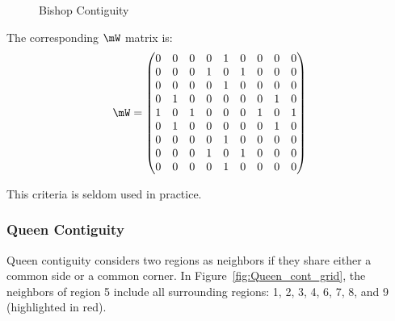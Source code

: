\documentclass[english,12pt]{book}\usepackage[]{graphicx}\usepackage[]{xcolor}
\begin{document}
\begin{figure}[h]
\caption{Bishop Contiguity}
\label{fig:Bishop_cont_grid}
\centering
{}
\end{figure}

The corresponding $\mW$ matrix is:
\begin{equation*}
\mW = 
  \begin{pmatrix}
     0 & 0 & 0 & 0 & 1 & 0 & 0 & 0 & 0 \\
     0 & 0 & 0 & 1 & 0 & 1 & 0 & 0 & 0 \\
     0 & 0 & 0 & 0 & 1 & 0 & 0 & 0 & 0 \\
     0 & 1 & 0 & 0 & 0 & 0 & 0 & 1 & 0 \\
     1 & 0 & 1 & 0 & 0 & 0 & 1 & 0 & 1 \\
     0 & 1 & 0 & 0 & 0 & 0 & 0 & 1 & 0 \\
     0 & 0 & 0 & 0 & 1 & 0 & 0 & 0 & 0 \\
     0 & 0 & 0 & 1 & 0 & 1 & 0 & 0 & 0 \\
     0 & 0 & 0 & 0 & 1 & 0 & 0 & 0 & 0 \\
  \end{pmatrix}
\end{equation*}

This criteria is seldom used in practice. 

\subsubsection{Queen Contiguity}

Queen contiguity considers two regions as neighbors if they share either a common side or a common corner. In Figure~\ref{fig:Queen_cont_grid}, the neighbors of region 5 include all surrounding regions: 1, 2, 3, 4, 6, 7, 8, and 9 (highlighted in red).
\end{document}
